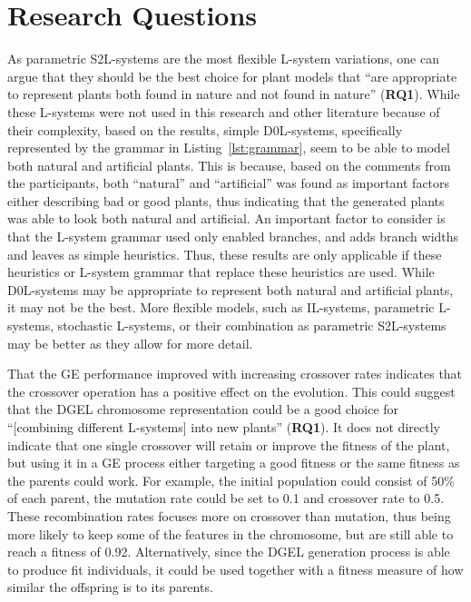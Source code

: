 \section{Research Questions}
As parametric S2L-systems are the most flexible \gls{L-system} variations, one can argue that they should be the best choice for plant models that ``are appropriate to represent plants both found in nature and not found in nature'' (\textbf{RQ1}).
While these \glspl{L-system} were not used in this research and other literature because of their complexity, based on the results, simple D0L-systems, specifically represented by the grammar in Listing~\ref{lst:grammar}, seem to be able to model both natural and artificial plants.
This is because, based on the comments from the participants, both ``natural'' and ``artificial'' was found as important factors either describing bad or good plants, thus indicating that the generated plants was able to look both natural and artificial.
An important factor to consider is that the \gls{L-system} grammar used only enabled branches, and adds branch widths and leaves as simple heuristics.
Thus, these results are only applicable if these heuristics or \gls{L-system} grammar that replace these heuristics are used.
While D0L-systems may be appropriate to represent both natural and artificial plants, it may not be the best.
More flexible models, such as IL-systems, parametric \glspl{L-system}, stochastic \glspl{L-system}, or their combination as parametric S2L-systems may be better as they allow for more detail.

That the \gls{GE} performance improved with increasing crossover rates indicates that the crossover operation has a positive effect on the evolution.
This could suggest that the \gls{DGEL} chromosome representation could be a good choice for ``[combining different \glspl{L-system}] into new plants'' (\textbf{RQ1}).
It does not directly indicate that one single crossover will retain or improve the fitness of the plant, but using it in a \gls{GE} process either targeting a good fitness or the same fitness as the parents could work.
For example, the initial population could consist of 50\% of each parent, the mutation rate could be set to 0.1 and crossover rate to 0.5.
These recombination rates focuses more on crossover than mutation, thus being more likely to keep some of the features in the chromosome, but are still able to reach a fitness of 0.92.
Alternatively, since the \gls{DGEL} generation process is able to produce fit individuals, it could be used together with a fitness measure of how similar the offspring is to its parents.

